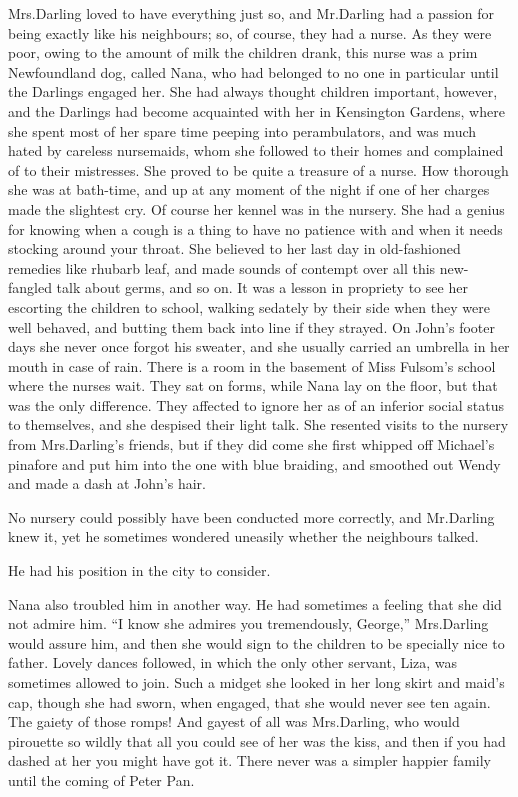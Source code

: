 Mrs.\@ Darling loved to have everything just so,
and Mr.\@ Darling had a passion for being exactly like his neighbours;
so, of course, they had a nurse.
As they were poor, owing to the amount of milk the children drank,
this nurse was a prim Newfoundland dog, called Nana,
who had belonged to no one in particular until the Darlings engaged her.
She had always thought children important, however,
and the Darlings had become acquainted with her in Kensington Gardens,
where she spent most of her spare time peeping into perambulators,
and was much hated by careless nursemaids,
whom she followed to their homes and complained of to their mistresses.
She proved to be quite a treasure of a nurse.
How thorough she was at bath-time,
and up at any moment of the night if one of her charges made the slightest cry.
Of course her kennel was in the nursery.
She had a genius for knowing when a cough is a thing to have no patience with
and when it needs stocking around your throat.
She believed to her last day in old-fashioned remedies like rhubarb leaf,
and made sounds of contempt over all this new-fangled talk about germs, and so on.
It was a lesson in propriety to see her escorting the children to school,
walking sedately by their side when they were well behaved,
and butting them back into line if they strayed.
On John’s footer days she never once forgot his sweater,
and she usually carried an umbrella in her mouth in case of rain.
There is a room in the basement of Miss Fulsom’s school where the nurses wait.
They sat on forms, while Nana lay on the floor, but that was the only difference.
They affected to ignore her as of an inferior social status to themselves,
and she despised their light talk.
She resented visits to the nursery from Mrs.\@ Darling’s friends,
but if they did come she first whipped off Michael’s pinafore and put him into the one with blue braiding,
and smoothed out Wendy and made a dash at John’s hair.

No nursery could possibly have been conducted more correctly, and Mr.\@ Darling knew it,
yet he sometimes wondered uneasily whether the neighbours talked.

He had his position in the city to consider.

Nana also troubled him in another way.
He had sometimes a feeling that she did not admire him.
“I know she admires you tremendously, George,” Mrs.\@ Darling would assure him,
and then she would sign to the children to be specially nice to father.
Lovely dances followed, in which the only other servant, Liza, was sometimes allowed to join.
Such a midget she looked in her long skirt and maid’s cap,
though she had sworn, when engaged, that she would never see ten again.
The gaiety of those romps!
And gayest of all was Mrs.\@ Darling,
who would pirouette so wildly that all you could see of her was the kiss,
and then if you had dashed at her you might have got it.
There never was a simpler happier family until the coming of Peter Pan.

